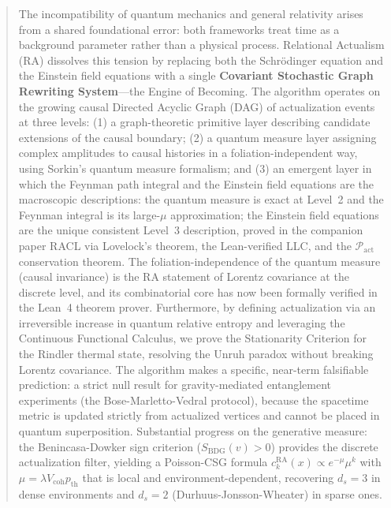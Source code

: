 \documentclass[11pt,a4paper]{article}
\theoremstyle{plain}
\theoremstyle{definition}
\theoremstyle{remark}
\begin{document}
\begin{abstract}
The incompatibility of quantum mechanics and general relativity arises from a
shared foundational error: both frameworks treat time as a background parameter
rather than a physical process. Relational Actualism (RA) dissolves this tension
by replacing both the Schr\"{o}dinger equation and the Einstein field equations
with a single \textbf{Covariant Stochastic Graph Rewriting System}---the Engine
of Becoming. The algorithm operates on the growing causal Directed Acyclic Graph
(DAG) of actualization events at three levels: (1) a graph-theoretic primitive
layer describing candidate extensions of the causal boundary; (2) a quantum
measure layer assigning complex amplitudes to causal histories in a
foliation-independent way, using Sorkin's quantum measure formalism; and (3) an
emergent layer in which the Feynman path integral and the Einstein field equations
are the macroscopic descriptions: the quantum measure is exact at Level~2 and
the Feynman integral is its large-$\mu$ approximation; the Einstein field
equations are the unique consistent Level~3 description, proved in the companion
paper RACL via Lovelock's theorem,
the Lean-verified LLC, and the $\mathcal{P}_{\mathrm{act}}$ conservation theorem. The foliation-independence of the quantum measure
(causal invariance) is the RA statement of Lorentz covariance at the discrete
level, and its combinatorial core has now been formally verified in the Lean~4
theorem prover. Furthermore, by defining actualization via an irreversible
increase in quantum relative entropy and leveraging the Continuous Functional
Calculus, we prove the Stationarity Criterion for the Rindler thermal state,
resolving the Unruh paradox without breaking Lorentz covariance. The algorithm
makes a specific, near-term falsifiable prediction: a strict null result for
gravity-mediated entanglement experiments (the Bose-Marletto-Vedral protocol),
because the spacetime metric is updated strictly from actualized vertices and
cannot be placed in quantum superposition. Substantial progress on the
generative measure: the Benincasa-Dowker sign criterion
($S_{\mathrm{BDG}}(v) > 0$) provides the discrete actualization filter,
yielding a Poisson-CSG formula $c_k^{\mathrm{RA}}(x) \propto e^{-\mu}\mu^k$
with $\mu = \lambda V_{\mathrm{coh}} p_{\mathrm{th}}$ that is local and
environment-dependent, recovering $d_s = 3$ in dense environments and
$d_s = 2$ (Durhuus-Jonsson-Wheater) in sparse ones.


\end{abstract}
\end{document}
